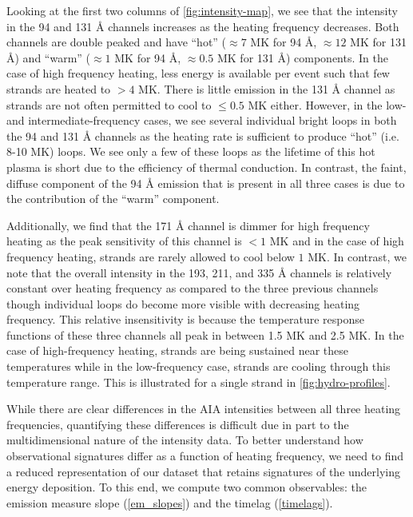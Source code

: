 Looking at the first two columns of \autoref{fig:intensity-map}, we see that the intensity in the 94 and 131 \AA{} channels increases as the heating frequency decreases. Both channels are double peaked and have ``hot'' ($\approx7$ MK for 94 \AA{}, $\approx12$ MK for 131 \AA{}) and ``warm'' ($\approx1$ MK for 94 \AA{}, $\approx0.5$ MK for 131 \AA{}) components. In the case of high frequency heating, less energy is available per event such that few strands are heated to $>4$ MK. There is little emission in the 131 \AA{} channel as strands are not often permitted to cool to $\leq0.5$ MK either. However, in the low- and intermediate-frequency cases, we see several individual bright loops in both the 94 and 131 \AA{} channels as the heating rate is sufficient to produce ``hot'' (i.e. 8-10 MK) loops. We see only a few of these loops as the lifetime of this hot plasma is short due to the efficiency of thermal conduction. In contrast, the faint, diffuse component of the 94 \AA{} emission that is present in all three cases is due to the contribution of the ``warm'' component. 

Additionally, we find that the 171 \AA{} channel is dimmer for high frequency heating as the peak sensitivity of this channel is $<1$ MK and in the case of high frequency heating, strands are rarely allowed to cool below $1$ MK. In contrast, we note that the overall intensity in the 193, 211, and 335 \AA{} channels is relatively constant over heating frequency as compared to the three previous channels though individual loops do become more visible with decreasing heating frequency. This relative insensitivity is because the temperature response functions of these three channels all peak in between 1.5 MK and 2.5 MK. In the case of high-frequency heating, strands are being sustained near these temperatures while in the low-frequency case, strands are cooling through this temperature range. This is illustrated for a single strand in \autoref{fig:hydro-profiles}.

While there are clear differences in the AIA intensities between all three heating frequencies, quantifying these differences is difficult due in part to the multidimensional nature of the intensity data. To better understand how observational signatures differ as a function of heating frequency, we need to find a reduced representation of our dataset that retains signatures of the underlying energy deposition. To this end, we compute two common observables: the emission measure slope (\autoref{em_slopes}) and the timelag (\autoref{timelags}).

